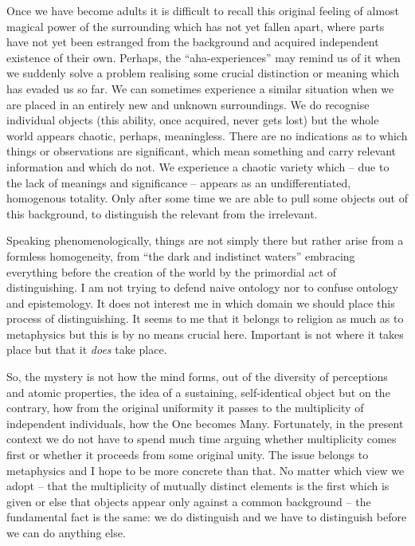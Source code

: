 Once we have become adults it is difficult to recall this original feeling of almost magical power of the surrounding which has not yet fallen apart, where parts have not yet been estranged from the background and acquired independent existence of their own. Perhaps, the ``aha-experiences'' may remind us of it when we suddenly solve a problem realising some crucial distinction or meaning which has evaded us so far. We can sometimes experience a similar situation when we are placed in an entirely new and unknown surroundings. We do recognise individual objects (this ability, once acquired, never gets lost) but the whole world appears chaotic, perhaps, meaningless. There are no indications as to which things or observations are significant, which mean something and carry relevant information and which do not. We experience a chaotic variety which -- due to the lack of meanings and significance -- appears as an undifferentiated, homogenous totality. Only after some time we are able to pull some objects out of this background, to distinguish the relevant from the irrelevant. 

Speaking phenomenologically, things are not simply there but rather arise from a formless homogeneity, from ``the dark and indistinct waters'' embracing everything before the creation of the world by the primordial act of distinguishing. I am not trying to defend naive ontology nor to confuse ontology and epistemology. It does not interest me in which domain we should place this process of distinguishing. It seems to me that it belongs to religion as much as to metaphysics but this is by no means crucial here. Important is not where it takes place but that it 
{\em does} take place.

So, the mystery is not how the mind forms, out of the diversity of perceptions and atomic properties, the idea of a sustaining, self-identical object but on the contrary, how from the original uniformity it passes to the multiplicity of independent individuals, how the One becomes Many. Fortunately, in the present context we do not have to spend much time arguing whether multiplicity comes first or whether it proceeds from some original unity. 
The issue belongs to metaphysics and I hope to be more concrete than that. No matter which view we adopt -- that the multiplicity of mutually distinct elements is the first which 
is given or else that objects appear only against a common background -- the fundamental 
fact is the same: we do distinguish and we have to distinguish before we can do anything 
else.

